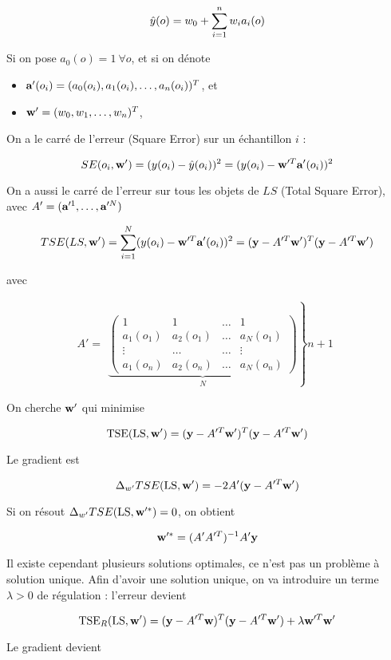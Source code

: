	$$\hat{y}(o) = w_0 + \sum_{i = 1}^n w_i a_i(o)$$
	
	Si on pose $a_0(o) = 1 \: \forall o$, et si on dénote
	
	\begin{itemize}
		\item $\textbf{a}'(o_i) = (a_0(o_i), a_1(o_i), \dots , a_n(o_i))^T$, et
		\item $\textbf{w}' = (w_0, w_1, \dots , w_n)^T$,
	\end{itemize}
	
	On a le carré de l'erreur (Square Error) sur un échantillon $i$ :
	
	$$SE(o_i, \textbf{w}') = (y(o_i) - \hat{y}(o_i))^2 = (y(o_i) - \textbf{w}'^T\textbf{a}'(o_i))^2$$
	
	On a aussi le carré de l'erreur sur tous les objets de $LS$ (Total Square Error), avec $A' = (\textbf{a}'^1, \dots , \textbf{a}'^N)$
	
	$$TSE(LS, \textbf{w}') = \sum_{i = 1}^N (y(o_i) - \textbf{w}'^T\textbf{a}'(o_i))^2 = (\textbf{y} - A'^T\textbf{w}')^T(\textbf{y} - A'^T\textbf{w}')$$
	
	avec
	
	$$A' = \begin{array}{c}\left. \underbrace{\begin{pmatrix}
	1 & 1 & \dots & 1 \\ 
	a_1(o_1) & a_2(o_1) & \dots & a_N(o_1) \\ 
	\vdots & \dots & \dots & \vdots \\ 
	a_1(o_n) & a_2(o_n) & \dots & a_N(o_n)
	\end{pmatrix}}_{N}\right\} n + 1\end{array} $$
	
		
	On cherche $\textbf{w}'$ qui minimise
		
	$$\text{TSE}(\text{LS}, \textbf{w}') = (\textbf{y} - A'^T\textbf{w}')^T(\textbf{y} - A'^T\textbf{w}')$$
		
	Le gradient est
		
	$$\Delta_{w'} TSE(\text{LS}, \textbf{w}') = -2 A' (\textbf{y} - A'^T\textbf{w}')$$
		
	Si on résout $\Delta_{w'} TSE(\text{LS}, \textbf{w}'^*) = 0$, on obtient
		
	$$\textbf{w}'^* = (A'A'^T)^{-1}A'\textbf{y}$$
		
	Il existe cependant plusieurs solutions optimales, ce n'est pas un problème à solution unique. Afin d'avoir une solution unique, on va introduire un terme $\lambda > 0$ de régulation : l'erreur devient
	
	$$\text{TSE}_R(\text{LS}, \textbf{w}') = (\textbf{y} - A'^T\textbf{w})^T(\textbf{y} - A'^T\textbf{w}') + \lambda \textbf{w}'^T\textbf{w}'$$
	
	Le gradient devient
	
